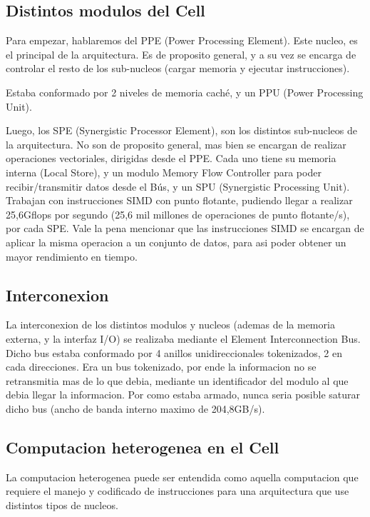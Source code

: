\documentclass[10pt,compsoc]{IEEEtran}
\begin{document}
	
	\subsection{Distintos modulos del Cell} 
	\noindent Para empezar, hablaremos del PPE (Power Processing Element). Este nucleo, es el principal de la arquitectura. Es de proposito general, y a su vez se encarga de controlar el resto de los sub-nucleos (cargar memoria y ejecutar instrucciones).
	
	Estaba conformado por 2 niveles de memoria caché, y un PPU (Power Processing Unit).\newline
	
	Luego, los SPE (Synergistic Processor Element), son los distintos sub-nucleos de la arquitectura. No son de proposito general, mas bien se encargan de realizar operaciones vectoriales, dirigidas desde el PPE. Cada uno tiene su memoria interna (Local Store), y un modulo Memory Flow Controller para poder recibir/transmitir datos desde el Bús, y un SPU (Synergistic Processing Unit).
	Trabajan con instrucciones SIMD con punto flotante, pudiendo llegar a realizar 25,6Gflops por segundo (25,6 mil millones de operaciones de punto flotante/s), por cada SPE. Vale la pena mencionar que las instrucciones SIMD se encargan de aplicar la misma operacion a un conjunto de datos, para asi poder obtener un mayor rendimiento en tiempo.\newline
	
	\subsection{Interconexion} 
	\noindent La interconexion de los distintos modulos y nucleos (ademas de la memoria externa, y la interfaz I/O) se realizaba mediante el Element Interconnection Bus. Dicho bus estaba conformado por 4 anillos unidireccionales tokenizados, 2 en cada direcciones. Era un bus tokenizado, por ende la informacion no se retransmitia mas de lo que debia, mediante un identificador del modulo al que debia llegar la informacion. 
	Por como estaba armado, nunca seria posible saturar dicho bus (ancho de banda interno maximo de 204,8GB/s).
	

	
	\subsection{Computacion heterogenea en el Cell }%
	\noindent La computacion heterogenea puede ser entendida como aquella computacion que requiere el manejo y codificado de instrucciones para una arquitectura que use distintos tipos de nucleos.\newline
	
\end{document}
